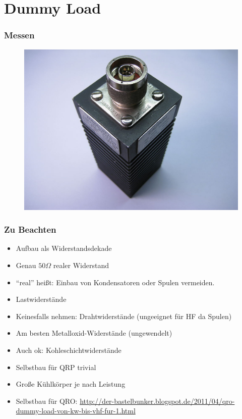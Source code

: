 \section*{Dummy Load}

\begin{frame}
  \frametitle{Messen}
  \begin{center}
    \begin{figure}
      \includegraphics[width=.99\textwidth,height=.75\textheight,keepaspectratio]{e17/DummyLoad.jpg}
    \end{figure}
  \end{center}
\end{frame}

\begin{frame}
  \frametitle{Zu Beachten}
  \begin{itemize}
    \item Aufbau als Widerstandsdekade
    \item Genau $50 \Omega$ realer Widerstand
    \item ``real'' heißt: Einbau von Kondensatoren oder Spulen vermeiden.
    \item Lastwiderstände
    \item Keinesfalls nehmen: Drahtwiderstände (ungeeignet für HF da Spulen)
    \item Am besten Metalloxid-Widerstände (ungewendelt)
    \item Auch ok: Kohleschichtwiderstände
    \item Selbstbau für QRP trivial
    \item Große Kühlkörper je nach Leistung
    \item Selbstbau für QRO: \url{http://der-bastelbunker.blogspot.de/2011/04/qro-dummy-load-von-kw-bis-vhf-fur-1.html}
  \end{itemize}
\end{frame}

